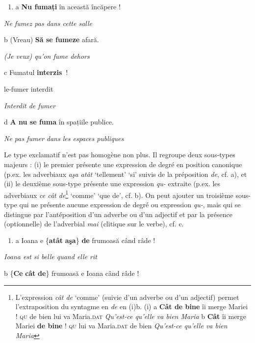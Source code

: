 \begin{enumerate}
\item \label{bkm:Ref299127024}a  \textbf{Nu fumați} în această încăpere !


\end{enumerate}
{\itshape
Ne fumez pas dans cette salle}

  b  (Vreau) \textbf{Să se fumeze} afară.

{\itshape
(Je veux) qu'on fume dehors}

  c  Fumatul  \textbf{interzis~}!

    le-fumer  interdit

{\itshape
Interdit de fumer}

  d  \textbf{A nu se fuma} în spațiile publice.

{\itshape
Ne pas fumer dans les espaces publiques}

Le type exclamatif n'est pas homogène non plus. Il regroupe deux sous-types majeurs : (i) le premier présente une expression de degré en position canonique (p.ex. les adverbiaux \textit{aşa {\textbar} atât} `tellement' {\textbar} `si' suivis de la préposition \textit{de}, cf. a), et (ii) le deuxième sous-type présente une expression \textit{qu-} extraite (p.ex. les adverbiaux \textit{ce {\textbar} cât de}\footnote{L'expression \textit{cât de} `comme' (suivie d'un adverbe ou d'un adjectif) permet l'extraposition du syntagme en \textit{de} en (i)b.
(i)  a  \textbf{Cât  de  bine}  îi  merge  Mariei !
    \textsc{qu}  de  bien  lui  va  Maria.\textsc{dat}
    \textit{Qu'est-ce qu'elle va bien Maria}
 b  \textbf{Cât}  îi  merge  Mariei  \textbf{de  bine} !
    \textsc{qu}  lui  va  Maria\textsc{.dat}  de  bien
    \textit{Qu'est-ce qu'elle va bien Maria}} `comme' {\textbar} `que de', cf. b). On peut ajouter un troisième sous-type qui ne présente aucune expression de degré ou expression \textit{qu-}, mais qui se distingue par l'antéposition d'un adverbe ou d'un adjectif et par la présence (optionnelle) de l'adverbial \textit{mai} (clitique sur le verbe), cf. c. 


\begin{enumerate}
\item \label{bkm:Ref299128099}a  Ioana e \{\textbf{atât} {\textbar} \textbf{aşa}\} \textbf{de} frumoasă când râde !


\end{enumerate}
{\itshape
Ioana est si belle quand elle rit}

  b  \{\textbf{Ce} {\textbar} \textbf{cât}  \textbf{de}\}  frumoasă  e  Ioana  când  râde !

